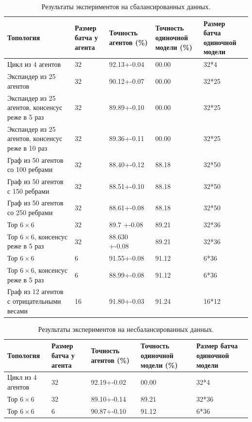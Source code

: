 \documentclass[a4paper,article,14pt]{extarticle}
\begin{document}
\begin{center}
    \begin{longtable}{|p{5cm}|p{2cm}|p{3cm}|p{3cm}|p{2cm}|}
    \caption{Результаты экспериментов на сбалансированных данных.}
    \label{table:tab1}\\
    \hline
    \textbf{Топология} & \textbf{Размер батча у агента} & \textbf{Точность агентов (\%)} & \textbf{Точность одиночной модели (\%)} & \textbf{Размер батча одиночной модели}\\
    \hline
    Цикл из 4 агентов & 32 & 92.13+-0.04 & 00.00 & 32*4\\
    \hline
    Экспандер из 25 агентов & 32 & 90.12+-0.07 & 00.00 & 32*25\\
    \hline
    Экспандер из 25 агентов, консенсус реже в 5 раз & 32 & 89.89+-0.10 & 00.00 & 32*25\\
    \hline
    Экспандер из 25 агентов, консенсус реже в 10 раз & 32 & 89.36+-0.11 & 00.00 & 32*25\\
    \hline
    Граф из 50 агентов со 100 ребрами & 32 & 88.40+-0.12 & 88.18 & 32*50\\
    \hline
    Граф из 50 агентов с 150 ребрами & 32 & 88.51+-0.10 & 88.18 & 32*50\\
    \hline
    Граф из 50 агентов со 250 ребрами & 32 & 88.61+-0.08 & 88.18 & 32*50\\
    \hline
    Тор $6\times 6$ & 32 & 89.7 +-0.08 & 89.21 & 32*36\\
    \hline
    Тор $6\times 6$, консенсус реже в 5 раз & 32 & 88.630 +-0.08 & 89.21 & 32*36\\
    \hline
    Тор $6\times 6$ & 6 & 91.55+-0.08 & 91.12 & 6*36\\
    \hline
    Тор $6\times 6$, консенсус реже в 5 раз & 6 & 88.99+-0.08 & 91.12 & 6*36\\
    \hline
    Граф из 12 агентов с отрицательными весами & 16 & 91.80+-0.03 & 91.24 & 16*12\\
    \hline
    \end{longtable}
\end{center}

\begin{center}
    \begin{longtable}{|p{5cm}|p{2cm}|p{3cm}|p{3cm}|p{2cm}|}
    \caption{Результаты экспериментов на несбалансированных данных.}
    \label{table:tab2}\\
    \hline
    \textbf{Топология} & \textbf{Размер батча у агента} & \textbf{Точность агентов (\%)} & \textbf{Точность одиночной модели (\%)} & \textbf{Размер батча одиночной модели}\\
    \hline
    Цикл из 4 агентов & 32 & 92.19+-0.02 & 00.00 & 32*4\\
    \hline
    Тор $6\times 6$ & 32 & 89.10+-0.14 & 89.21 & 32*36\\
    \hline
    Тор $6\times 6$ & 6 & 90.87+-0.10 & 91.12 & 6*36\\
    \hline
    \end{longtable}
\end{center}
\end{document}
